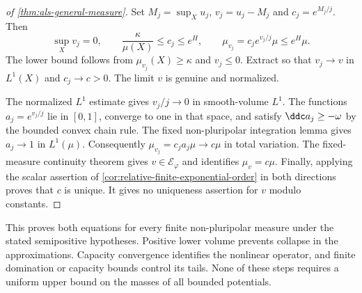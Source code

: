 \begin{proof}[of \cref{thm:als-general-measure}]
Set $M_j=\sup_Xu_j$, $v_j=u_j-M_j$ and $c_j=e^{M_j/j}$. Then
\[
 \sup_Xv_j=0,\qquad
 \frac{\kappa}{\mu(X)}\leq c_j\leq e^H,\qquad
 \mu_{v_j}=c_je^{v_j/j}\mu\leq e^H\mu.
\]
The lower bound follows from $\mu_{v_j}(X)\geq\kappa$ and $v_j\leq0$. Extract so that $v_j\to v$ in $L^1(X)$ and $c_j\to c>0$. The limit $v$ is genuine and normalized.

The normalized $L^1$ estimate gives $v_j/j\to0$ in smooth-volume $L^1$. The functions $a_j=e^{v_j/j}$ lie in $[0,1]$, converge to one in that space, and satisfy $\ddc a_j\geq-\omega$ by the bounded convex chain rule. The fixed non-pluripolar integration lemma gives $a_j\to1$ in $L^1(\mu)$. Consequently $\mu_{v_j}=c_ja_j\mu\to c\mu$ in total variation. The fixed-measure continuity theorem gives $v\in\mathcal E_\varphi$ and identifies $\mu_v=c\mu$. Finally, applying the scalar assertion of \cref{cor:relative-finite-exponential-order} in both directions proves that $c$ is unique. It gives no uniqueness assertion for $v$ modulo constants.
\end{proof}

This proves both equations for every finite non-pluripolar measure under the stated semipositive hypotheses. Positive lower volume prevents collapse in the approximations. Capacity convergence identifies the nonlinear operator, and finite domination or capacity bounds control its tails. None of these steps requires a uniform upper bound on the masses of all bounded potentials.
